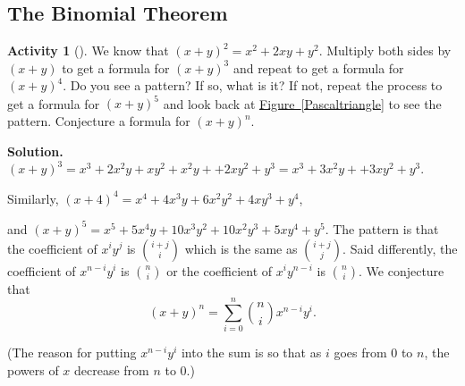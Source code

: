 \documentclass[10pt,]{book}
\theoremstyle{plain}
\theoremstyle{definition}
\newtheorem{activity}[project]{Activity}
\numberwithin{equation}{chapter}
\begin{document}
\subsection[{The Binomial Theorem}]{The Binomial Theorem}\label{subsection-8}
\begin{activity}[]\label{Conjecturebinomthm}
We know that \((x+y)^2 = x^2+2xy+y^2\). Multiply both sides by \((x+y)\) to get a formula for \((x+y)^3\) and repeat to get a formula for \((x+y)^4\). Do you see a pattern? If so, what is it? If not, repeat the process to get a formula for \((x+y)^5\) and look back at \hyperref[Pascaltriangle]{Figure~\ref{Pascaltriangle}} to see the pattern. Conjecture a formula for \((x+y)^n\).%
\par\medskip\noindent%
\textbf{Solution.}\quad \((x+y)^3=x^3+2x^2y +xy^2+x^2y+ +2xy^2 +y^3=x^3+3x^2y++3xy^2+y^3\).%
\par
Similarly, \((x+4)^4=x^4+4x^3y+6x^2y^2+4xy^3+y^4\),%
\par
and \((x+y)^5=x^5+5x^4y+10x^3y^2+10x^2y^3+5xy^4+y^5.\) The pattern is that the coefficient of \(x^iy^j\) is \(i+j\choose i\) which is the same as \(i+j\choose j\). Said differently, the coefficient of \(x^{n-i}y^i\) is \(n\choose i\) or the coefficient of \(x^iy^{n-i}\) is \(n\choose
i\). We conjecture that%
\begin{equation*}
(x+y)^n=\sum_{i=0}^n {n\choose i}x^{n-i}y^i.
\end{equation*}
%
\par
(The reason for putting \(x^{n-i}y^i\) into the sum is so that as \(i\) goes from 0 to \(n\), the powers of \(x\) decrease from \(n\) to 0.)%
\end{activity}
\end{document}
